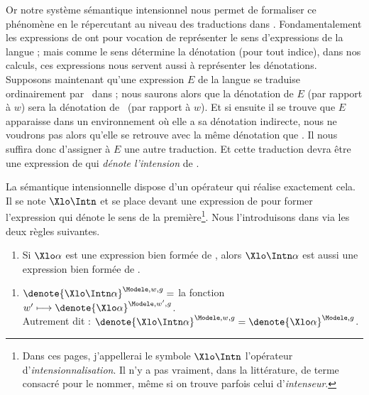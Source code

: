 Or notre système sémantique intensionnel nous permet de formaliser ce phénomène en le répercutant au niveau des traductions dans {\LO}.
Fondamentalement les expressions de {\LO} ont pour vocation de représenter le sens d'expressions de la langue ; mais comme le sens détermine la dénotation (pour tout indice), dans nos calculs, ces expressions nous servent aussi à représenter les dénotations. 
Supposons maintenant qu'une expression $E$ de la langue se traduise ordinairement par \vrb\alpha\ dans {\LO} ; nous saurons alors que la dénotation de $E$ (par rapport à $w$) sera la dénotation de \vrb\alpha\ (par rapport à $w$). Et si ensuite il se trouve que $E$ apparaisse dans un environnement où elle a sa dénotation indirecte, nous ne voudrons pas alors qu'elle se retrouve avec la même dénotation que \vrb\alpha. Il nous suffira donc d'assigner à $E$ une autre traduction. 
Et cette traduction devra être une expression de {\LO} qui \emph{dénote l'intension} de \vrb\alpha. 

La sémantique intensionnelle dispose d'un opérateur qui réalise exactement cela. Il se note $\Xlo\Intn$ et se place devant une expression de {\LO} pour former l'expression qui dénote le sens de la première\footnote{Dans ces pages, j'appellerai le symbole $\Xlo\Intn $ l'opérateur  d'\emph{intensionnalisation}. Il n'y a pas vraiment, dans la littérature, de terme consacré pour le nommer, même si on trouve parfois celui d'\emph{intenseur}.}. 
Nous l'introduisons dans {\LO} via les deux règles suivantes.

\label{p:^}


\begin{defi}
\begin{enumerate}[resume*=RglSyn1] %
  \item
Si $\Xlo\alpha$ est une expression bien formée de {\LO}, alors
$\Xlo\Intn\alpha$ est aussi une expression bien formée de {\LO}.
\label{Syn^}
\setcounter{RglSynt}{\value{enumi}}
\end{enumerate}
\begin{enumerate}[resume*=RglSem2] %
\item \(\denote{\Xlo\Intn\alpha}^{\Modele,w,g}= \) la fonction \(w'\longmapsto
 \denote{\Xlo\alpha}^{\Modele,w',g} \).
\\
Autrement dit : \(\denote{\Xlo\Intn\alpha}^{\Modele,w,g}=\denote{\Xlo\alpha}^{\Modele,g}\).
\label{Sem^}
\setcounter{RglSem}{\value{enumi}}
\end{enumerate}
\end{defi}


